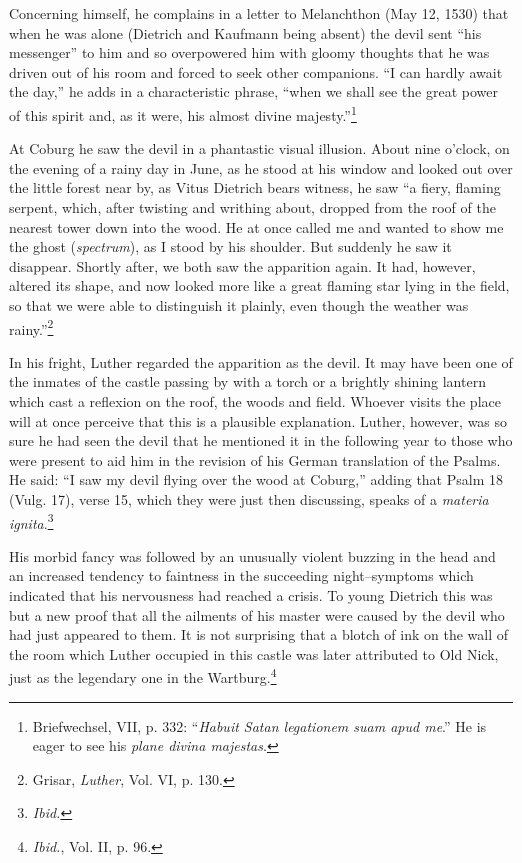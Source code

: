 Concerning himself, he complains in a letter to Melanchthon (May
12, 1530) that when he was alone (Dietrich and Kaufmann being
absent) the devil sent “his messenger” to him and so overpowered him
with gloomy thoughts that he was driven out of his room and forced
to seek other companions. “I can hardly await the day,” he adds in a
characteristic phrase, “when we shall see the great power of this
spirit and, as it were, his almost divine majesty.”\footnote
{Briefwechsel, VII, p. 332: “\textit{Habuit Satan legationem suam apud me}.” He is eager to
see his \textit{plane divina majestas}.}

At Coburg he saw the devil in a phantastic visual illusion. About
nine o’clock, on the evening of a rainy day in June, as he stood at his
window and looked out over the little forest near by, as Vitus Dietrich
bears witness, he saw “a fiery, flaming serpent, which, after twisting
and writhing about, dropped from the roof of the nearest tower
down into the wood. He at once called me and wanted to show me
the ghost (\textit{spectrum}), as I stood by his shoulder. But suddenly he saw
it disappear. Shortly after, we both saw the apparition again. It had,
however, altered its shape, and now looked more like a great flaming
star lying in the field, so that we were able to distinguish it plainly,
even though the weather was rainy.”\footnote{Grisar, \textit{Luther}, Vol. VI, p. 130.}

In his fright, Luther regarded
the apparition as the devil. It may have been one of the inmates of the
castle passing by with a torch or a brightly shining lantern which cast
a reflexion on the roof, the woods and field. Whoever visits the place
will at once perceive that this is a plausible explanation. Luther, however,
was so sure he had seen the devil that he mentioned it in the following
year to those who were present to aid him in the revision of his
German translation of the Psalms. He said: “I saw my devil flying
over the wood at Coburg,” adding that Psalm 18 (Vulg. 17), verse
15, which they were just then discussing, speaks of a \textit{materia ignita}.\footnote{\textit{Ibid.}}


His morbid fancy was followed by an unusually violent buzzing in
the head and an increased tendency to faintness in the succeeding
night--symptoms which indicated that his nervousness had reached
a crisis. To young Dietrich this was but a new proof that all the ailments
of his master were caused by the devil who had just appeared
to them. It is not surprising that a blotch of ink on the wall of the
room which Luther occupied in this castle was later attributed to Old
Nick, just as the legendary one in the Wartburg.\footnote{\textit{Ibid.}, Vol. II, p. 96.}

